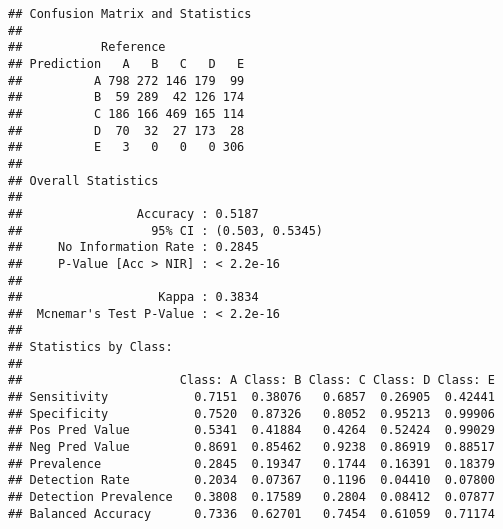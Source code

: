 \documentclass[]{article}
\newenvironment{Shaded}{\begin{snugshade}}{\end{snugshade}}
\newcommand{\KeywordTok}[1]{\textcolor[rgb]{0.13,0.29,0.53}{\textbf{{#1}}}}
\newcommand{\DataTypeTok}[1]{\textcolor[rgb]{0.13,0.29,0.53}{{#1}}}
\newcommand{\DecValTok}[1]{\textcolor[rgb]{0.00,0.00,0.81}{{#1}}}
\newcommand{\StringTok}[1]{\textcolor[rgb]{0.31,0.60,0.02}{{#1}}}
\newcommand{\NormalTok}[1]{{#1}}
\begin{document}
\begin{Shaded}
\end{Shaded}

\begin{verbatim}
## Confusion Matrix and Statistics
## 
##           Reference
## Prediction   A   B   C   D   E
##          A 798 272 146 179  99
##          B  59 289  42 126 174
##          C 186 166 469 165 114
##          D  70  32  27 173  28
##          E   3   0   0   0 306
## 
## Overall Statistics
##                                          
##                Accuracy : 0.5187         
##                  95% CI : (0.503, 0.5345)
##     No Information Rate : 0.2845         
##     P-Value [Acc > NIR] : < 2.2e-16      
##                                          
##                   Kappa : 0.3834         
##  Mcnemar's Test P-Value : < 2.2e-16      
## 
## Statistics by Class:
## 
##                      Class: A Class: B Class: C Class: D Class: E
## Sensitivity            0.7151  0.38076   0.6857  0.26905  0.42441
## Specificity            0.7520  0.87326   0.8052  0.95213  0.99906
## Pos Pred Value         0.5341  0.41884   0.4264  0.52424  0.99029
## Neg Pred Value         0.8691  0.85462   0.9238  0.86919  0.88517
## Prevalence             0.2845  0.19347   0.1744  0.16391  0.18379
## Detection Rate         0.2034  0.07367   0.1196  0.04410  0.07800
## Detection Prevalence   0.3808  0.17589   0.2804  0.08412  0.07877
## Balanced Accuracy      0.7336  0.62701   0.7454  0.61059  0.71174
\end{verbatim}

\begin{Shaded}
\end{Shaded}
\end{document}
